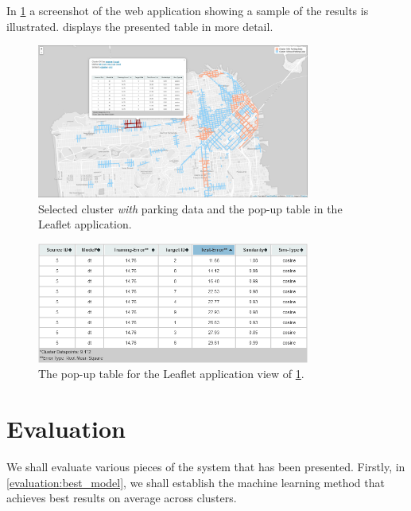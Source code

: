 In \cref{fig:cwith} a screenshot of the web application showing a sample of the results is illustrated.  displays the presented table in more detail.

\begin{figure}[!ht]
	\centering
	\includegraphics[width=0.8\textwidth]{graphics/cwith_source_dt_cosine.png}
	\caption{Selected cluster \textit{with} parking data and the pop-up table in the Leaflet application.}
	\label{fig:cwith}
\end{figure}

\begin{figure}[!ht]
	\centering
	\includegraphics[width=0.8\textwidth]{graphics/cwith_source_dt_cosine_table.png}
	\caption{The pop-up table for the Leaflet application view of \cref{fig:cwith}.}
	\label{fig:cwith_table}
\end{figure}

\section{Evaluation}
We shall evaluate various pieces of the system that has been presented. Firstly, in \cref{evaluation:best_model}, we shall establish the machine learning method that achieves best results on average across clusters. 

